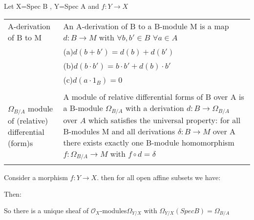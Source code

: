 \documentclass[a4paper, 12pt]{article}
\newcommand{\oxmods}{$\mathcal{O}_X$-modules}
\begin{document}
Let X=Spec B , Y=Spec A and $f:Y\longrightarrow X$ \\

\begin{tabular}{p{4cm} p{11cm}}


	A-derivation of B to M & An A-derivation of B to a B-module M is a map $d:B\longrightarrow M$ with $\forall b,b'\in B$ $\forall a  \in A$\\
	&(a)$d(b+b')=d(b)+d(b')$\\
	&(b)$d(b\cdot b')= b\cdot b' + d(b)\cdot b'$\\
	&(c)$d(a\cdot 1_B)= 0$\\
	
	
	&\\
	
	$\Omega_{B/A}$ module of (relative) differential (form)s & A module of relative differential forms of B over A is a B-module $\Omega_{B/A}$ with a derivation $d:B \longrightarrow \Omega_{B/A}$ over $A$ which satisfies the universal property: for all B-modules M and all derivations $\delta : B \longrightarrow M$ over A there exists exactly one B-module homomorphism $f: \Omega_{B/A} \longrightarrow M $ with $f \circ d = \delta $ \\
	
	&\\
\end{tabular}


Consider a morphism $f:Y \longrightarrow X$. then for all open affine subsets we have:



\begin{center}


 	
\end{center}

Then: 
%
%

So there is a unique sheaf of \oxmods $\Omega_{Y/X}$ with $\Omega_{Y/X}(Spec B) = \Omega_{B/A}$
\end{document}
